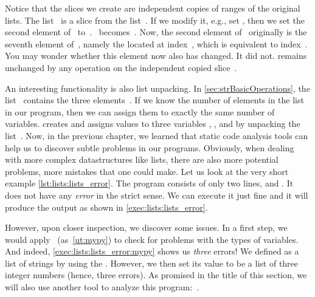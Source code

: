 Notice that the slices we create are independent copies of ranges of the original lists.
The list~ is a slice from the list~.
If we modify it, e.g., set , then we set the second element of~ to~.
~becomes~\pythonil{[7, 12, 6]}.
Now, the second element of~ originally is the seventh element of~, namely the  located at index~, which is equivalent to index~.
You may wonder whether this element now also has changed.
It did not.
 remains unchanged by any operation on the independent copied slice~.

An interesting functionality is also list unpacking.
In \cref{sec:strBasicOperations}, the list~ contains the three elements~\pythonil{[5, 6, 7]}.
If we know the number of elements in the list in our program, then we can assign them to exactly the same number of variables.
 creates and assigns values to three variables , , and  by unpacking the list~.%
%
\FloatBarrier%
\endhsection%
%
%
\label{sec:listExampleForErrorsAndRuff}%
%
%
%
%
Now, in the previous chapter, we learned that static code analysis tools can help us to discover subtle problems in our programs.
Obviously, when dealing with more complex datastructures like lists, there are also more potential problems, more mistakes that one could make.
Let us look at the very short example \cref{lst:lists:lists_error}.
The program consists of only two lines,  and .
It does not have any \emph{error} in the strict sense.
We can execute it just fine and it will produce the output \textil{[1, 2, 3]} as shown in \cref{exec:lists:lists_error}.

%

However, upon closer inspection, we discover some issues.
In a first step, we would apply \mypy~(as~\cref{ut:mypy}) to check for problems with the types of variables.
And indeed, \cref{exec:lists:lists_error:mypy} shows us \emph{three} errors!
We defined  as a list of strings by using the  .
However, we then set its value to be a list of three integer numbers (hence, three errors).
As promised in the title of this section, we will also use another tool to analyze this program:~\ruff.

